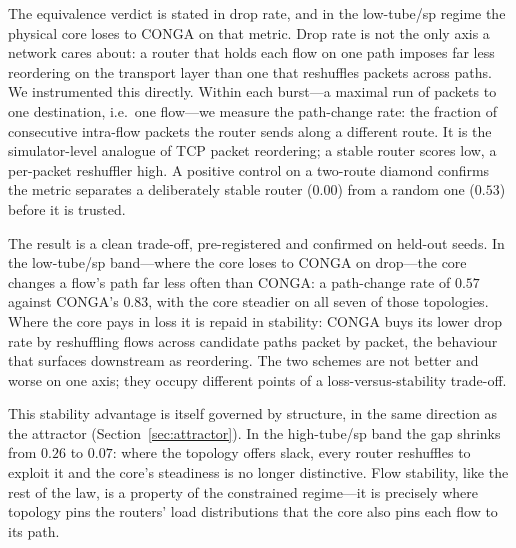 The equivalence verdict is stated in drop rate, and in the low-tube/sp regime the
physical core loses to CONGA on that metric. Drop rate is not the only axis a
network cares about: a router that holds each flow on one path imposes far less
reordering on the transport layer than one that reshuffles packets across paths.
We instrumented this directly. Within each burst---a maximal run of packets to one
destination, i.e.\ one flow---we measure the path-change rate: the fraction of
consecutive intra-flow packets the router sends along a different route.
It is the simulator-level analogue of TCP packet reordering; a stable router scores
low, a per-packet reshuffler high. A positive control on a two-route diamond
confirms the metric separates a deliberately stable router ($0.00$) from a random
one ($0.53$) before it is trusted.

The result is a clean trade-off, pre-registered and confirmed on held-out seeds.
In the low-tube/sp band---where the core loses to CONGA on drop---the core changes a
flow's path far less often than CONGA: a path-change rate of $0.57$ against CONGA's
$0.83$, with the core steadier on all seven of those topologies.
Where the core pays in loss it is repaid in stability: CONGA buys its lower drop
rate by reshuffling flows across candidate paths packet by packet, the behaviour
that surfaces downstream as reordering. The two schemes are not better and worse on
one axis; they occupy different points of a loss-versus-stability trade-off.

This stability advantage is itself governed by structure, in the same direction as
the attractor (Section~\ref{sec:attractor}). In the high-tube/sp band the gap
shrinks from $0.26$ to $0.07$: where the topology offers slack, every router
reshuffles to exploit it and the core's steadiness is no longer distinctive. Flow
stability, like the rest of the law, is a property of the constrained regime---it is
precisely where topology pins the routers' load distributions that the core also
pins each flow to its path.
